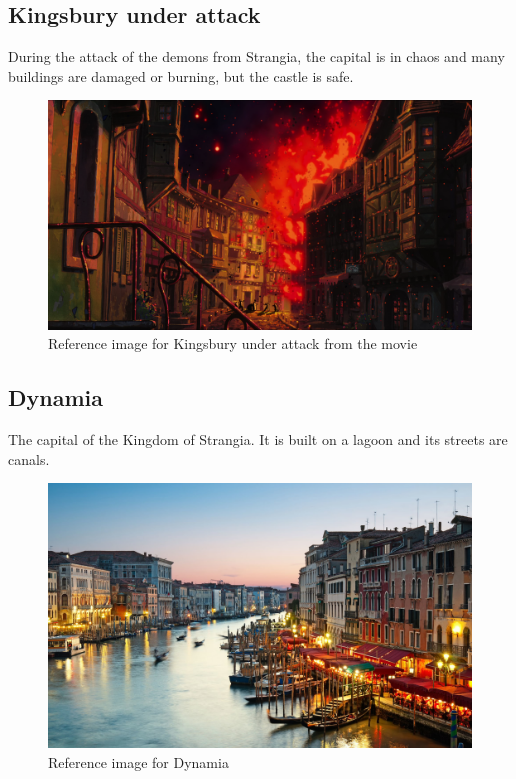 \subsection{Kingsbury under attack}
	During the attack of the demons from Strangia, the capital is in chaos and many buildings are damaged or burning, but the castle is safe.
	\begin{figure}[H]
	  \centering
	  \includegraphics[width=12cm]{../Images/Locations/kingsburyUnderAttack}
	  \caption{Reference image for Kingsbury under attack from the movie}
	\end{figure}

\subsection{Dynamia}
	The capital of the Kingdom of Strangia. It is built on a lagoon and its streets are canals.
	\begin{figure}[H]
	  \centering
	  \includegraphics[width=12cm]{../Images/Locations/dynamia}
	  \caption{Reference image for Dynamia}
	\end{figure}
	
